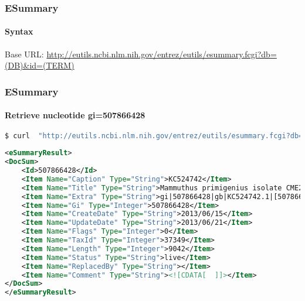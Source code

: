 \documentclass{beamer}
\begin{document}
\begin{frame}[fragile]
\frametitle{ESummary}
\framesubtitle{Syntax}
Base URL:
\url{http://eutils.ncbi.nlm.nih.gov/entrez/eutils/esummary.fcgi?db=(DB)\&id=(TERM)}
\end{frame}


\begin{frame}[fragile]
\frametitle{ESummary}
\framesubtitle{Retrieve nucleotide gi=507866428}
\begin{lstlisting}[language=bash,basicstyle=\tiny,breaklines=true]
$ curl  "http://eutils.ncbi.nlm.nih.gov/entrez/eutils/esummary.fcgi?db=nucleotide&id=507866428"
\end{lstlisting}

\begin{lstlisting}[language=xml,basicstyle=\tiny,breaklines=false]
<eSummaryResult>
<DocSum>
	<Id>507866428</Id>
	<Item Name="Caption" Type="String">KC524742</Item>
	<Item Name="Title" Type="String">Mammuthus primigenius isolate CME2005/915 myoglobin (Mb) gene, partial cds</Item>
	<Item Name="Extra" Type="String">gi|507866428|gb|KC524742.1|[507866428]</Item>
	<Item Name="Gi" Type="Integer">507866428</Item>
	<Item Name="CreateDate" Type="String">2013/06/15</Item>
	<Item Name="UpdateDate" Type="String">2013/06/21</Item>
	<Item Name="Flags" Type="Integer">0</Item>
	<Item Name="TaxId" Type="Integer">37349</Item>
	<Item Name="Length" Type="Integer">9042</Item>
	<Item Name="Status" Type="String">live</Item>
	<Item Name="ReplacedBy" Type="String"></Item>
	<Item Name="Comment" Type="String"><![CDATA[  ]]></Item>
</DocSum>
</eSummaryResult>
\end{lstlisting}
\end{frame}
\end{document}
